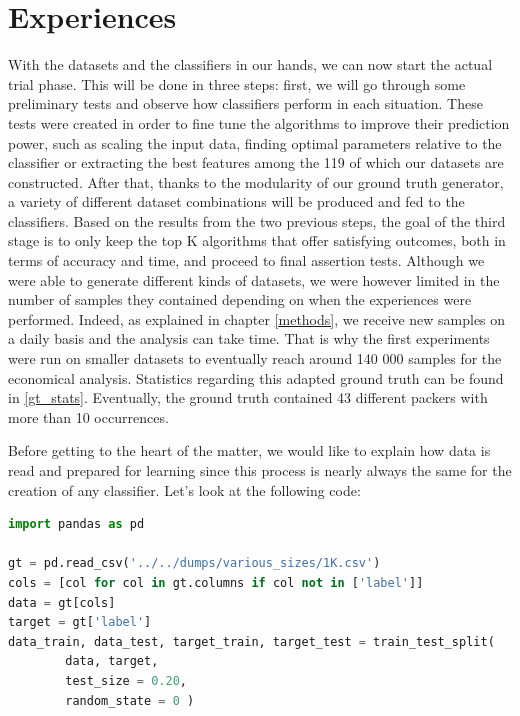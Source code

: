 \section{Experiences}
With the datasets and the classifiers in our hands, we can now start the actual trial phase. This will be done in three steps: first, we will go through some preliminary tests and observe how classifiers perform in each situation. These tests were created in order to fine tune the algorithms to improve their prediction power, such as scaling the input data, finding optimal parameters relative to the classifier or extracting the best features among the 119 of which our datasets are constructed. After that, thanks to the modularity of our ground truth generator, a variety of different dataset combinations will be produced and fed to the classifiers. Based on the results from the two previous steps, the goal of the third stage is to only keep the top K algorithms that offer satisfying outcomes, both in terms of accuracy and time, and proceed to final assertion tests. Although we were able to generate different kinds of datasets, we were however limited in the number of samples they contained depending on when the experiences were performed. Indeed, as explained in chapter \ref{methods}, we receive new samples on a daily basis and the analysis can take time. That is why the first experiments were run on smaller datasets to eventually reach around 140 000 samples for the economical analysis. Statistics regarding this adapted ground truth can be found in \autoref{gt_stats}. Eventually, the ground truth contained 43 different packers with more than 10 occurrences.


Before getting to the heart of the matter, we would like to explain how data is read and prepared for learning since this process is nearly always the same for the creation of any classifier. Let's look at the following code:

\begin{lstlisting}[language=python]
import pandas as pd

gt = pd.read_csv('../../dumps/various_sizes/1K.csv')
cols = [col for col in gt.columns if col not in ['label']]
data = gt[cols]
target = gt['label']
data_train, data_test, target_train, target_test = train_test_split(
        data, target,
        test_size = 0.20,
        random_state = 0 )
\end{lstlisting}

